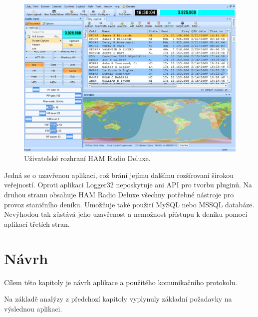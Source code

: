 \begin{figure}[h]
\centering
\includegraphics[trim=0cm 0cm 0cm 0cm, scale=0.33]{fig/hrd}
\caption{Uživatelské rozhraní HAM Radio Deluxe.}
\label{fig:ham_radio_deluxe}
\end{figure}

Jedná se o uzavřenou aplikaci, což brání jejímu dalšímu rozšírovaní širokou veřejností. Oproti aplikaci
Logger32 neposkytuje ani API pro tvorbu pluginů. Na druhou stranu obsahuje HAM Radio Deluxe všechny
potřebné nástroje pro provoz staničního deníku. Umožňuje také použití MySQL nebo MSSQL databáze.
Nevýhodou tak zůstává jeho uzavřenost a nemožnost přístupu k deníku pomocí aplikací třetích stran.


\chapter{Návrh}
\label{navrh}

Cílem této kapitoly je návrh aplikace a použitého komunikačního protokolu.

Na základě analýzy z předchozí kapitoly vyplynuly základní požadavky
na výslednou aplikaci.

